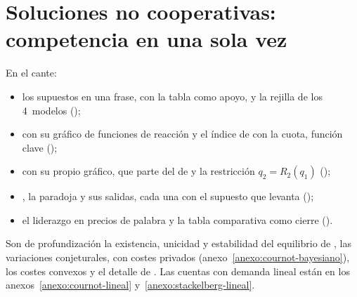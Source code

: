 \documentclass[11pt]{article}
\begin{document}
\section{Soluciones no cooperativas:\cortetitulo{} competencia en una sola vez}\label{sec:analisis-estatico}

\begin{notaopositor}
En el cante:
\begin{itemize}
\item los supuestos en una frase, con la tabla como apoyo, y la rejilla de los 4~modelos ();
\item {} con su gráfico de funciones de reacción y el índice de  con la cuota, función clave ();
\item {} con su propio gráfico, que parte del de  y la restricción $q_2=R_2(q_1)$ ();
\item {}, la paradoja y sus salidas, cada una con el supuesto que levanta ();
\item el liderazgo en precios de palabra y la tabla comparativa como cierre ().
\end{itemize}
Son de profundización la existencia, unicidad y estabilidad del equilibrio de , las variaciones conjeturales,  con costes privados (anexo~\ref{anexo:cournot-bayesiano}), los costes convexos y el detalle de . Las cuentas con demanda lineal están en los anexos~\ref{anexo:cournot-lineal} y~\ref{anexo:stackelberg-lineal}.
\end{notaopositor}
\end{document}
